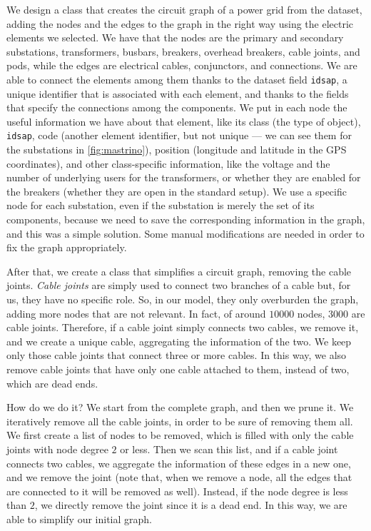 We design a class that creates the circuit graph of a power grid from the dataset, adding the nodes and the edges to the graph in the right way using the electric elements we selected. We have that the nodes are the primary and secondary substations, transformers, busbars, breakers, overhead breakers, cable joints, and pods, while the edges are electrical cables, conjunctors, and connections. We are able to connect the elements among them thanks to the dataset field \texttt{idsap}, a unique identifier that is associated with each element, and thanks to the fields that specify the connections among the components. We put in each node the useful information we have about that element, like its class (the type of object), \texttt{idsap}, code (another element identifier, but not unique --- we can see them for the substations in \autoref{fig:mastrino}), position (longitude and latitude in the GPS coordinates), and other class-specific information, like the voltage and the number of underlying users for the transformers, or whether they are enabled for the breakers (whether they are open in the standard setup). We use a specific node for each substation, even if the substation is merely the set of its components, because we need to save the corresponding information in the graph, and this was a simple solution. Some manual modifications are needed in order to fix the graph appropriately.

After that, we create a class that simplifies a circuit graph, removing the cable joints. \emph{Cable joints} are simply used to connect two branches of a cable but, for us, they have no specific role. So, in our model, they only overburden the graph, adding more nodes that are not relevant. In fact, of around $10000$ nodes, $3000$ are cable joints. Therefore, if a cable joint simply connects two cables, we remove it, and we create a unique cable, aggregating the information of the two. We keep only those cable joints that connect three or more cables. In this way, we also remove cable joints that have only one cable attached to them, instead of two, which are dead ends.

How do we do it? We start from the complete graph, and then we prune it. We iteratively remove all the cable joints, in order to be sure of removing them all. We first create a list of nodes to be removed, which is filled with only the cable joints with node degree $2$ or less. Then we scan this list, and if a cable joint connects two cables, we aggregate the information of these edges in a new one, and we remove the joint (note that, when we remove a node, all the edges that are connected to it will be removed as well). Instead, if the node degree is less than $2$, we directly remove the joint since it is a dead end. In this way, we are able to simplify our initial graph.


